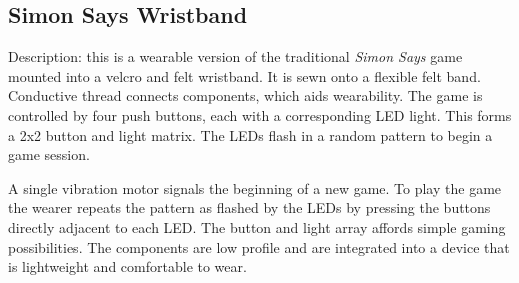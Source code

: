 \documentclass{chi-ext}
\begin{document}

\subsection{Simon Says Wristband}
Description: this is a wearable version of the traditional \emph{Simon Says} game mounted into a velcro and felt wristband.  It is sewn onto a flexible felt band. Conductive thread connects components, which aids wearability. The game is controlled by four push buttons, each with a corresponding LED light. This forms a 2x2 button and light matrix. The LEDs flash in a random pattern to begin a game session. 

A single vibration motor signals the beginning of a new game. To play the game the wearer repeats the pattern as flashed by the LEDs by pressing the buttons directly adjacent to each LED. The button and light array affords simple gaming possibilities. The components are low profile and are integrated into a device that is lightweight and comfortable to wear. 

\end{document}
